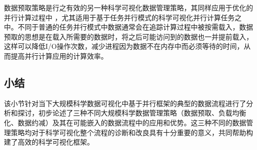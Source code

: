 数据预取策略是行之有效的另一种科学可视化数据管理策略，其同样应用于优化的并行计算过程中
，尤其适用于基于任务并行模式的科学可视化并行计算任务之中。不同于普通的任务并行模式中数据通常会在追踪计算过程中被按需载入，数据预取的思想是在载入所需要的数据时，将之后可能访问到的数据也一并提前载入，这样可以降低I/O操作次数，减少进程因为数据不在内存中而必须等待的时间，从而提高并行计算应用的计算效率。

\subsection{小结}
该小节针对当下大规模科学数据可视化中基于并行框架的典型的数据流程进行了分析和探讨，初步论述了三种不同大规模科学数据管理策略（数据预取、负载均衡化、数据约减）及其在可能嵌入的数据流程中的应用和优势。这三种不同的数据管理策略均对于科学可视化整个流程的诊断和改良具有十分重要的意义，共同帮助构建了高效的科学可视化框架。


